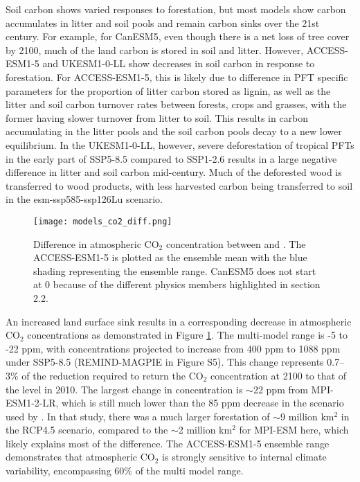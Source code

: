 \documentclass[draft]{agujournal2019}
\begin{document}
Soil carbon shows varied responses to forestation, but most models show carbon accumulates in litter and soil pools and remain carbon sinks over the 21st century.
For example, for CanESM5, even though there is a net loss of tree cover by 2100, much of the land carbon is stored in soil and litter.
However, ACCESS-ESM1-5 and UKESM1-0-LL show decreases in soil carbon in response to forestation.
For ACCESS-ESM1-5, this is likely due to difference in PFT specific parameters for the proportion of litter carbon stored as lignin, as well as the litter and soil carbon turnover rates between forests, crops and grasses, with the former having slower turnover from litter to soil.
This results in carbon accumulating in the litter pools and the soil carbon pools decay to a new lower equilibrium.
In the UKESM1-0-LL, however, severe deforestation of tropical PFTs in the early part of SSP5-8.5 compared to SSP1-2.6 results in a large negative difference in litter and soil carbon mid-century.
Much of the deforested wood is transferred to wood products, with less harvested carbon being transferred to soil in the esm-ssp585-ssp126Lu scenario.

\begin{figure}
    \texttt{[image: models\_co2\_diff.png]}
    \caption{Difference in atmospheric CO$_2$ concentration between  and . The ACCESS-ESM1-5 is plotted as the ensemble mean with the blue shading representing the ensemble range. CanESM5 does not start at 0 because of the different physics members highlighted in section 2.2.}
    \label{fig:models_CO2}
\end{figure}

An increased land surface sink results in a corresponding decrease in atmospheric CO$_2$ concentrations as demonstrated in Figure \ref{fig:models_CO2}.
The multi-model range is -5 to -22 ppm, with concentrations projected to increase from 400 ppm to 1088 ppm under SSP5-8.5 (REMIND-MAGPIE in Figure S5).
This change represents 0.7–3\% of the reduction required to return the CO$_2$ concentration at 2100 to that of the level in 2010.
The largest change in concentration is $\sim$22 ppm from MPI-ESM1-2-LR, which is still much lower than the 85 ppm decrease in the scenario used by .
In that study, there was a much larger forestation of $\sim$9 million km$^2$ in the RCP4.5 scenario, compared to the $\sim$2 million km$^2$ for MPI-ESM here, which likely explains most of the difference.
The ACCESS-ESM1-5 ensemble range demonstrates that atmospheric CO$_2$ is strongly sensitive to internal climate variability, encompassing 60\% of the multi model range.
\end{document}
